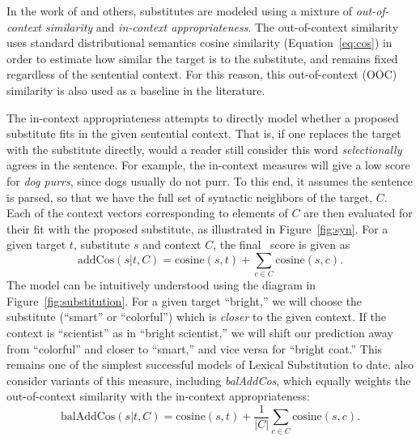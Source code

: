 In the work of  and others, substitutes are modeled
using a mixture of {\em out-of-context similarity} and {\em in-context
appropriateness}. The out-of-context similarity uses standard distributional
semantics cosine similarity (Equation~\ref{eq:cos}) in order to estimate how similar
the target is to the substitute, and remains fixed regardless of the sentential
context.  For this reason, this out-of-context (OOC) similarity is also used as
a baseline in the literature.

The in-context appropriateness attempts to directly model
whether a proposed substitute fits in the given sentential context. That is, if
one replaces the target with the substitute directly, would a reader still
consider this word {\em selectionally} agrees in the sentence. For example,
the in-context measures will give a low score for {\em dog purrs}, since dogs
usually do not purr.
To this end, it assumes the sentence is parsed, so that we have the full set of
syntactic neighbors of the target, $C$. Each of the context vectors
corresponding to elements of $C$ are then evaluated for their fit with the
proposed substitute, as illustrated in Figure~\ref{fig:syn}. For a given target
$t$, substitute $s$ and context $C$, the final \addCos~score is given as
\begin{equation}
  \text{addCos}(s|t,C) = \text{cosine}(s, t) + \sum_{c\in C} \text{cosine}(s, c).
\end{equation}
The model can be intuitively understood using the diagram in
Figure~\ref{fig:substitution}. For a given target ``bright,'' we will choose
the substitute (``smart'' or ``colorful'') which is {\em closer} to the
given context. If the context is ``scientist'' as in ``bright scientist,''
we will shift our prediction away from ``colorful'' and closer to ``smart,''
and vice versa for ``bright coat.'' This remains one of the simplest successful
models of Lexical Substitution to date.  also consider
variants of this measure, including {\em balAddCos}, which equally
weights the out-of-context similarity with the in-context appropriateness:
\begin{equation}
  \text{balAddCos}(s|t,C) = \text{cosine}(s, t) + \frac{1}{|C|}\sum_{c\in C} \text{cosine}(s, c).
\end{equation}

